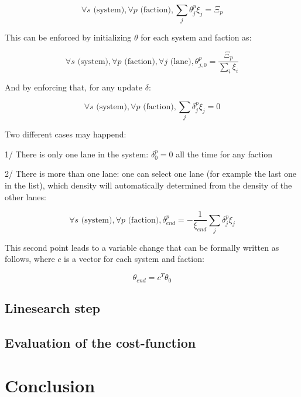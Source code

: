 \documentclass[11pt,a4paper]{article}		%
\begin{document}
\begin{equation}
\forall s \text{ (system)}, \forall p \text{ (faction)}, \sum_j \theta_j^p \xi_j = \Xi_p
\end{equation}

This can be enforced by initializing $\theta$ for each system and faction as:

\begin{equation}
\forall s \text{ (system)}, \forall p \text{ (faction)}, \forall j \text{ (lane)}, \theta_{j,0}^p = \dfrac{\Xi_p}{\sum_i \xi_i}
\end{equation}

And by enforcing that, for any update $\delta$:

\begin{equation}
\forall s \text{ (system)}, \forall p \text{ (faction)}, \sum_j \delta_j^p \xi_j = 0
\end{equation}

Two different cases may happend:

1/ There is only one lane in the system: $\delta_0^p = 0$ all the time for any faction

2/ There is more than one lane: one can select one lane (for example the last one in the list), which density will automatically determined from the density of the other lanes:

\begin{equation}
\forall s \text{ (system)}, \forall p \text{ (faction)}, \delta_{end}^p = - \dfrac{1}{\xi_{end}} \sum_j \delta_j^p \xi_j
\end{equation}

This second point leads to a variable change that can be formally written as follows, where $c$ is a vector for each system and faction: 

\begin{equation}
\theta_{end} = c^T \theta_0
\end{equation}

\subsection{Linesearch step}

\subsection{Evaluation of the cost-function}

\section{Conclusion}
\end{document}
